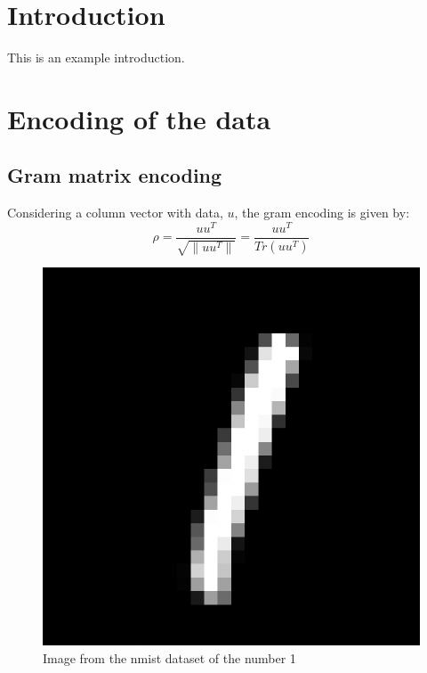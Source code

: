 




\coverpage

\section{Introduction}
This is an example introduction.

\section{Encoding of the data}
\subsection{Gram matrix encoding}

Considering a column vector with data, $u$, the gram encoding is given by:
$$
\rho = \frac{uu^T}{\sqrt{\| uu^T \|}} = \frac{uu^T}{Tr(uu^T)}
$$

\begin{figure}
    \centering
    \includegraphics[width=\linewidth]{figures/nmist_1_data.png}
    \caption{Image from the nmist dataset of the number 1}
    \label{fig:dataset_one}
\end{figure}

